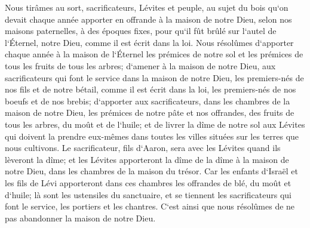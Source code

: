 \verse Nous tirâmes au sort, sacrificateurs, Lévites et peuple, au sujet du bois qu`on devait chaque année apporter en offrande à la maison de notre Dieu, selon nos maisons paternelles, à des époques fixes, pour qu`il fût brûlé sur l`autel de l`Éternel, notre Dieu, comme il est écrit dans la loi. 
\verse Nous résolûmes d`apporter chaque année à la maison de l`Éternel les prémices de notre sol et les prémices de tous les fruits de tous les arbres; 
\verse d`amener à la maison de notre Dieu, aux sacrificateurs qui font le service dans la maison de notre Dieu, les premiers-nés de nos fils et de notre bétail, comme il est écrit dans la loi, les premiers-nés de nos boeufs et de nos brebis; 
\verse d`apporter aux sacrificateurs, dans les chambres de la maison de notre Dieu, les prémices de notre pâte et nos offrandes, des fruits de tous les arbres, du moût et de l`huile; et de livrer la dîme de notre sol aux Lévites qui doivent la prendre eux-mêmes dans toutes les villes situées sur les terres que nous cultivons. 
\verse Le sacrificateur, fils d`Aaron, sera avec les Lévites quand ils lèveront la dîme; et les Lévites apporteront la dîme de la dîme à la maison de notre Dieu, dans les chambres de la maison du trésor. 
\verse Car les enfants d`Israël et les fils de Lévi apporteront dans ces chambres les offrandes de blé, du moût et d`huile; là sont les ustensiles du sanctuaire, et se tiennent les sacrificateurs qui font le service, les portiers et les chantres. C`est ainsi que nous résolûmes de ne pas abandonner la maison de notre Dieu. 

